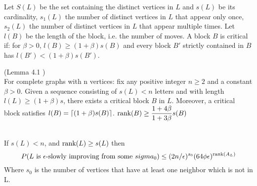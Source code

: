 Let $S(L)$ be the set containing the distinct vertices in $L$ and $s(L)$ be its cardinality, $s_1(L)$ the number of distinct vertices in $L$ that appear only once, $s_2(L)$ the number of distinct vertices in $L$ that appear multiple times. Let $l(B)$ be the length of the block, i.e. the number of moves.
A block $B$ is critical if: for $\beta > 0$, $l(B) \geq (1 + \beta)s(B)$ and every block $B'$ strictly contained in $B$ has $l(B') < (1+\beta)s(B')$.

\begin{lemma}
\label{critical}
(Lemma 4.1 \cite{angel2016local}) \\
For complete graphs with n vertices: fix any positive integer $n \geq 2$ and a constant $\beta > 0$. Given a sequence consisting of $s(L) < n$ letters and with length $l(L) \geq (1 +\beta)s$, there exists a critical block $B$ in $L$. Moreover, a critical block satisfies $l(B) = \lceil(1 + \beta)s(B)\rceil$.
$\text{rank}(B) \geq \dfrac{1+4\beta}{1 + 3\beta}s(B)$
\end{lemma} 

\begin{lemma} \leavevmode \\
\label{boundN}
If $s(L) < n$, and $\text{rank}(L) \geq s(L)$ then \\
\begin{equation*}
P(L \text{ is }\epsilon\text{-slowly improving from some }sigma_0)  \leq (2n/\epsilon)^{s_0}(64\phi\epsilon)^{\text{rank}(A_L)}
\end{equation*}
Where $s_0$ is the number of vertices that have at least one neighbor which is not in L. 
\end{lemma}

